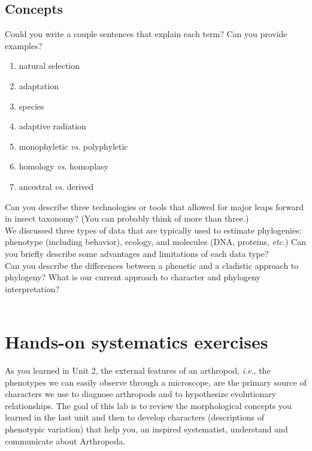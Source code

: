 \documentclass[letterpaper, 11pt]{article}
\begin{document}
\subsection{Concepts}
Could you write a couple sentences that explain each term? Can you provide examples?

\begin{enumerate} 
\item{natural selection} 
\item{adaptation}  
\item{species}  
\item {adaptive radiation}
\item {monophyletic \textit{vs}. polyphyletic}  
\item {homology \textit{vs}. homoplasy}  
\item {ancestral \textit{vs}. derived}
\end{enumerate}

\noindent{}Can you describe three technologies or tools that allowed for major leaps forward in insect taxonomy? (You can probably think of more than three.)\\

\noindent{}We discussed three types of data that are typically used to estimate phylogenies: phenotype (including behavior), ecology, and molecules (DNA, proteins, \textit{etc}.) Can you briefly describe some advantages and limitations of each data type?\\

\noindent{}Can you describe the differences between a phenetic and a cladistic approach to phylogeny? What is our current approach to character and phylogeny interpretation? \\

\\

\section{Hands-on systematics exercises}
As you learned in Unit 2, the external features of an arthropod, \textit{i.e}., the phenotypes we can easily observe through a microscope, are the primary source of characters we use to diagnose arthropods and to hypothesize evolutionary relationships. The goal of this lab is to review the morphological concepts you learned in the last unit and then to develop characters (descriptions of phenotypic variation) that help you, an inspired systematist, understand and communicate about Arthropoda.
\end{document}
